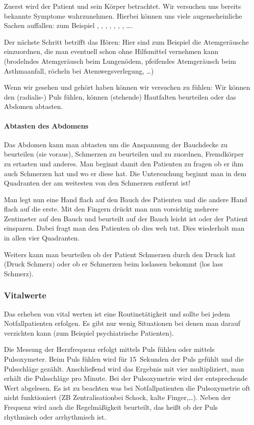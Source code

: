 Zuerst wird der Patient und sein
Körper betrachtet. Wir versuchen uns bereits bekannte Symptome wahrzunehmen. Hierbei können uns viele
augenscheinliche Sachen auffallen: zum Beispiel
, , ,
, , , ,
\ldots.

Der nächste Schritt betrifft das Hören: Hier sind zum
Beispiel die Atemgeräusche einzuordnen, die man eventuell schon ohne
Hilfsmittel vernehmen kann (brodelndes Atemgeräusch beim
Lungenödem, pfeifendes Atemgeräusch beim Asthmaanfall,
röcheln bei Atemwegsverlegung, \ldots)

Wenn wir gesehen und gehört haben können wir versuchen zu
fühlen: Wir können den (radialis-) Puls fühlen, können
(stehende) Hautfalten beurteilen oder das Abdomen abtasten.

\paragraph{Abtasten des
Abdomens}\label{topic:untersuchung-abdomen-abtasten}

Das Abdomen kann man abtasten um die Anspannung der
Bauchdecke zu beurteilen (sie voraus), Schmerzen zu
beurteilen und zu zuordnen, Fremdkörper zu ertasten und
anderes. Man beginnt damit den Patienten zu fragen ob er ihm
auch Schmerzen hat und wo er diese hat. Die Untersuchung
beginnt man in dem Quadranten der am weitesten von den
Schmerzen entfernt ist!

Man legt nun eine Hand flach auf den Bauch des Patienten und
die andere Hand flach auf die erste. Mit den Fingern drückt
man nun vorsichtig mehrere Zentimeter auf den Bauch und
beurteilt auf der Bauch leicht ist oder der Patient
einsparen. Dabei fragt man den Patienten ob dies weh tut.
Dies wiederholt man in allen vier Quadranten.

Weiters kann man beurteilen ob der Patient Schmerzen durch
den Druck hat (Druck Schmerz) oder ob er Schmerzen beim
loslassen bekommt (los lass Schmerz).
\subsubsection{Vitalwerte}
Das erheben von vital werten ist eine Routinetätigkeit und
sollte bei jedem Notfallpatienten erfolgen. Es gibt nur wenig
Situationen bei denen man darauf verzichten kann (zum
Beispiel psychiatrische Patienten).

Die Messung der Herzfrequenz erfolgt mittels Puls fühlen oder
mittels Pulsoxymeter. Beim Puls fühlen wird für 15~Sekunden
der Puls gefühlt und die Pulsschläge gezählt. Anschließend wird
das Ergebnis mit vier multipliziert, man erhält die
Pulsschläge pro Minute. Bei der Pulsoxymetrie wird der
entsprechende Wert abgelesen. Es ist zu beachten was bei
Notfallpatienten die Pulsoxymetrie oft nicht funktioniert (ZB
Zentralisationbei Schock, kalte Finger,\ldots). Neben der
Frequenz wird auch die Regelmäßigkeit beurteilt, das heißt ob
der Puls rhythmisch oder arrhythmisch ist.

